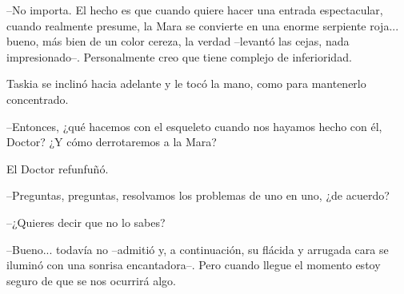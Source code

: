 --No importa. El hecho es que cuando quiere hacer una entrada espectacular, cuando realmente presume, la Mara se convierte en una enorme serpiente roja... bueno, más bien de un color cereza, la verdad --levantó las cejas, nada impresionado--. Personalmente creo que tiene complejo de inferioridad.

Taskia se inclinó hacia adelante y le tocó la mano, como para mantenerlo concentrado. 

--Entonces, ¿qué hacemos con el esqueleto cuando nos hayamos hecho con él, Doctor? ¿Y cómo derrotaremos a la Mara?

El Doctor refunfuñó. 

--Preguntas, preguntas, resolvamos los problemas de uno en uno, ¿de acuerdo?

--¿Quieres decir que no lo sabes?

--Bueno... todavía no --admitió y, a continuación, su flácida y arrugada cara se iluminó con una sonrisa encantadora--. Pero cuando llegue el momento estoy seguro de que se nos ocurrirá algo.
